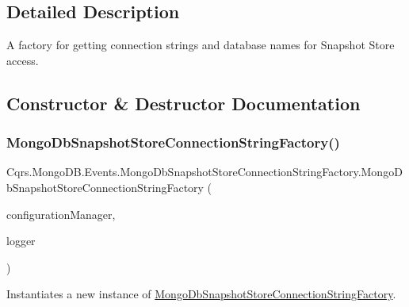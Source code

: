 \subsection{Detailed Description}
A factory for getting connection strings and database names for Snapshot Store access. 



\subsection{Constructor \& Destructor Documentation}
\mbox{\label{classCqrs_1_1MongoDB_1_1Events_1_1MongoDbSnapshotStoreConnectionStringFactory_a6fcf4743adc439f88a8a443095a3ab5c_a6fcf4743adc439f88a8a443095a3ab5c}} 
\subsubsection{\texorpdfstring{Mongo\+Db\+Snapshot\+Store\+Connection\+String\+Factory()}{MongoDbSnapshotStoreConnectionStringFactory()}}
{\footnotesize\ttfamily Cqrs.\+Mongo\+D\+B.\+Events.\+Mongo\+Db\+Snapshot\+Store\+Connection\+String\+Factory.\+Mongo\+Db\+Snapshot\+Store\+Connection\+String\+Factory (\begin{DoxyParamCaption}\item[{\hyperlink{interfaceCqrs_1_1Configuration_1_1IConfigurationManager}{I\+Configuration\+Manager}}]{configuration\+Manager,  }\item[{I\+Logger}]{logger }\end{DoxyParamCaption})}



Instantiates a new instance of \hyperlink{classCqrs_1_1MongoDB_1_1Events_1_1MongoDbSnapshotStoreConnectionStringFactory}{Mongo\+Db\+Snapshot\+Store\+Connection\+String\+Factory}. 



